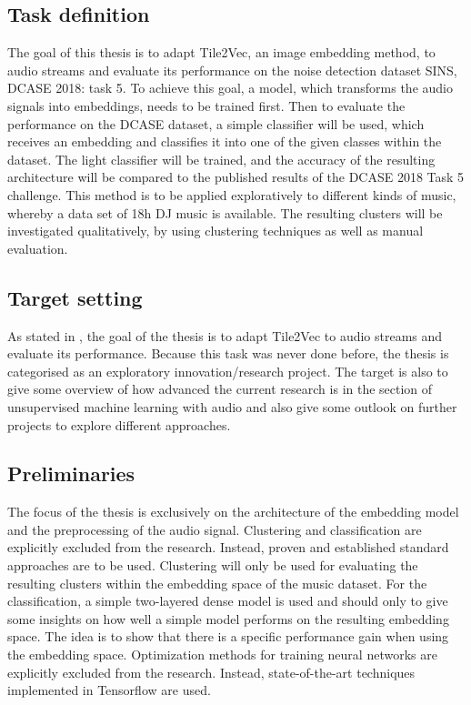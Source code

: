 \subsection{Task definition}
\label{sub:Task-Definition}
The goal of this thesis is to adapt Tile2Vec, an image embedding method, to audio streams and evaluate its performance on the noise detection dataset \flqq SINS, DCASE 2018: task 5\frqq. 
\newline
\newline
To achieve this goal, a model, which transforms the audio signals into embeddings, needs to be trained first. Then to evaluate the performance on the DCASE dataset, a simple classifier will be used, which receives an embedding and classifies it into one of the given classes within the dataset. The light classifier will be trained, and the accuracy of the resulting architecture will be compared to the published results of the DCASE 2018 Task 5 challenge.
\newline
\newline
This method is to be applied exploratively to different kinds of music, whereby a data set of 18h DJ music is available. The resulting clusters will be investigated qualitatively, by using clustering techniques as well as manual evaluation.

\subsection{Target setting}
\label{sub:Target-Setting}
As stated in , the goal of the thesis is to adapt Tile2Vec to audio streams and evaluate its performance. Because this task was never done before, the thesis is categorised as an exploratory innovation/research project. The target is also to give some overview of how advanced the current research is in the section of unsupervised machine learning with audio and also give some outlook on further projects to explore different approaches.

\subsection{Preliminaries}
\label{sub:Preliminaries}
The focus of the thesis is exclusively on the architecture of the embedding model and the preprocessing of the audio signal. Clustering and classification are explicitly excluded from the research. Instead, proven and established standard approaches are to be used.
\newline
\newline
Clustering will only be used for evaluating the resulting clusters within the embedding space of the music dataset. For the classification, a simple two-layered dense model is used and should only to give some insights on how well a simple model performs on the resulting embedding space. The idea is to show that there is a specific performance gain when using the embedding space.
\newline
\newline
Optimization methods for training neural networks are explicitly excluded from the research. Instead, state-of-the-art techniques implemented in Tensorflow are used.
